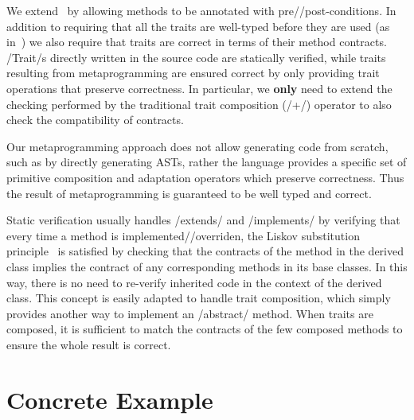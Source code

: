 
We extend~\cite{servetto2014meta} by allowing
methods to be annotated with pre//post-conditions.
In addition to requiring that all the traits are well-typed before they are used (as in~\cite{servetto2014meta}) we also require that traits are correct in terms of their method contracts.
/Trait/s directly written in the source code are statically verified, while traits resulting from metaprogramming are ensured correct by only providing trait operations that preserve correctness. 
In particular, we \textbf{only} need to extend the checking performed by the traditional trait composition (/+/)  operator to also check the compatibility of contracts.

%
%
Our metaprogramming approach does not allow generating code from scratch, such as by directly generating ASTs, rather the language provides a specific set of primitive composition and adaptation operators which preserve correctness.
Thus the result of metaprogramming is guaranteed to be well typed and correct.


Static verification usually handles /extends/ and /implements/ by verifying that every 
time a method is implemented//overriden, 
the Liskov substitution principle~\cite{Liskov:1994:BNS:197320.197383} is satisfied
by checking that the contracts of the method in the derived class implies the contract of any corresponding methods in its base classes. 
 In this way, there is no need to re-verify
inherited code in the context of the derived class.
This concept is easily adapted
to handle trait composition, which simply provides another way to implement an /abstract/ method.
When traits are composed,
it is sufficient
to match the contracts of the few composed methods
to ensure the whole result is correct.

\section{Concrete Example}

